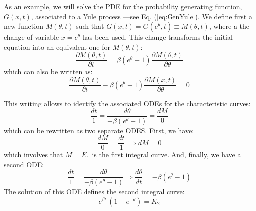 As an example, we will solve the PDE for the probability generating function, $G(x,t)$, associated to a Yule process ---see Eq. (\ref{eq:GenYule}). We define first a new function $M(\theta,t)$ such that $G(x,t)=G(e^{\theta},t) \equiv M(\theta,t)$, where a the change of variable $x = e^{\theta}$ has been used. This change transforms the initial equation into an equivalent one for $M(\theta,t)$: 
\begin{equation}
\frac{\partial M(\theta,t)}{\partial t} = \beta (e^{\theta}-1) \frac{\partial M(\theta,t)}{\partial \theta}
\end{equation}
which can also be written as:
\begin{equation}
\frac{\partial M(\theta,t)}{\partial t} - \beta (e^{\theta}-1) \frac{\partial M(x,t)}{\partial \theta} = 0
\end{equation}

This writing allows to identify the associated ODEs for the characteristic curves:
\begin{equation}
\frac{dt}{1} = \frac{d\theta}{-\beta (e^{\theta}-1)} = \frac{dM}{0}
\end{equation}
which can be rewritten as two separate ODES. First, we have:
\begin{equation}
\frac{dM}{0} = \frac{dt}{1} \,\, \Rightarrow dM = 0
\end{equation}
which involves that $M = K_1$ is the first integral curve. And, finally, we have a second ODE:
\begin{equation}
\frac{dt}{1} = \frac{d\theta}{-\beta (e^{\theta}-1)} \Rightarrow \frac{d\theta}{dt} = -\beta (e^{\theta}-1)
\end{equation}
The solution of this ODE defines the second integral curve:
\begin{equation}
e^{\beta t} \, (1 - e^{-\theta}) = K_2
\end{equation}


